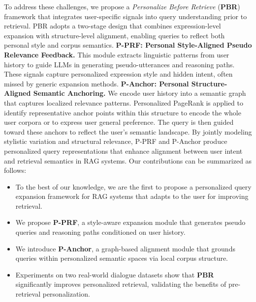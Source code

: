 To address these challenges, we propose a \textit{Personalize Before Retrieve} (\textbf{PBR}) framework that integrates user-specific signals into query understanding prior to retrieval. PBR adopts a two-stage design that combines expression-level expansion with structure-level alignment, enabling queries to reflect both personal style and corpus semantics.
\textbf{ P-PRF: Personal Style-Aligned Pseudo Relevance Feedback.}  
This module extracts linguistic patterns from user history to guide LLMs in generating pseudo-utterances and reasoning paths. These signals capture personalized expression style and hidden intent, often missed by generic expansion methods.
\textbf{ P-Anchor: Personal Structure-Aligned Semantic Anchoring.}  
We encode user history into a semantic graph that captures localized relevance patterns. Personalized PageRank is applied to identify representative anchor points within this structure to encode the whole user corpora or to express user general preference. The query is then guided toward these anchors to reflect the user’s semantic landscape.
By jointly modeling stylistic variation and structural relevance, P-PRF and P-Anchor produce personalized query representations that enhance alignment between user intent and retrieval semantics in RAG systems. Our contributions can be summarized as follows:
\begin{itemize}[leftmargin=*]
    \item To the best of our knowledge, we are the first to propose a personalized query expansion framework for RAG systems that adapts to the user for improving retrieval.
    \item We propose \textbf{P-PRF}, a style-aware expansion module that generates pseudo queries and reasoning paths conditioned on user history.
    \item We introduce \textbf{P-Anchor}, a graph-based alignment module that grounds queries within personalized semantic spaces via local corpus structure.
    \item Experiments on two real-world dialogue datasets show that \textbf{PBR} significantly improves personalized retrieval, validating the benefits of pre-retrieval personalization.
\end{itemize}


